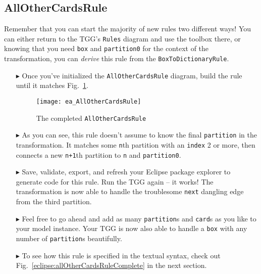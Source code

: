 \newpage
\hypertarget{allCards vis}{}
\subsection{AllOtherCardsRule}
\visHeader

Remember that you can start the majority of new rules two different ways! You can either return to the TGG's \texttt{Rules} diagram and use the toolbox
there, or knowing that you need \texttt{box} and \texttt{partition0} for the context of the transformation, you can \emph{derive} this rule from the
\texttt{BoxToDictionaryRule}.

\begin{itemize}

\item[$\blacktriangleright$] Once you've initialized the \texttt{AllOtherCardsRule} diagram, build the rule until it matches
Fig.~\ref{fig:ea_allOtherCardsRuleComplete}.

\begin{figure}[htbp]
\begin{center}
  \texttt{[image: ea\_AllOtherCardsRule]}
  \caption{The completed \texttt{AllOtherCardsRule}}
  \label{fig:ea_allOtherCardsRuleComplete}
\end{center}
\end{figure}

\item[$\blacktriangleright$] As you can see, this rule doesn't assume to know the final \texttt{partition} in the transformation. It matches some
\texttt{n}th partition with an \texttt{index} 2 or more, then connects a new \texttt{n+1}th partition to \texttt{n} and \texttt{partition0}. 

\item[$\blacktriangleright$] Save, validate, export, and refresh your Eclipse package explorer to generate code for this rule. Run the TGG again -- it works!
The transformation is now able to handle the troublesome \texttt{next} dangling edge from the third partition.

\item[$\blacktriangleright$] Feel free to go ahead and add as many \texttt{partition}s and \texttt{card}s as you like to your model instance. Your TGG is now
also able to handle a \texttt{box} with any number of \texttt{partition}s beautifully. 

\item[$\blacktriangleright$] To see how this rule is specified in the textual syntax, check out Fig.~\ref{eclipse:allOtherCardsRuleComplete} in the next
section.


\end{itemize}

